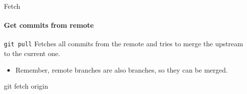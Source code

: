 \documentclass[aspectratio=169]{beamer}
\begin{document}
\begin{frame}{Fetch}
\framesubtitle{Get commits from remote}

\begin{block}{\texttt{git pull}}
	Fetches all commits from the remote and tries to merge the upstream to the current one.
\end{block}

\begin{itemize}
	\item Remember, remote branches are also branches, so they can be merged.
\end{itemize}

\end{frame}

\begin{frame}{git fetch origin}
\begin{figure}
	\begin{subfigure}[b]{\textwidth}
\centering
{}
	\end{subfigure}
	
	\begin{subfigure}[b]{\textwidth}
\centering
{}
	\end{subfigure}
\end{figure}

\end{frame}
\end{document}
